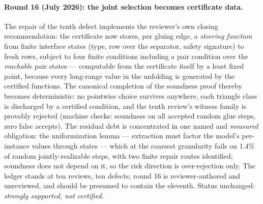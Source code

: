 \documentclass[
]{ceurart}
\theoremstyle{definition}
\begin{document}
\paragraph{Round 16 (July 2026): the joint selection becomes certificate
data.}
The repair of the tenth defect implements the reviewer's own closing
recommendation: the certificate now stores, per gluing edge, a
\emph{steering function} from finite interface states (type, row over
the separator, safety signature) to fresh rows, subject to four finite
conditions including a pair condition over the \emph{reachable} pair
states --- computable from the certificate itself by a least fixed
point, because every long-range value in the unfolding is generated by
the certified functions.  The canonical completion of the soundness
proof thereby becomes deterministic: no pointwise choice survives
anywhere, each triangle class is discharged by a certified condition,
and the tenth review's witness family is provably rejected (machine
checks: soundness on all accepted random glue steps, zero false
accepts).  The residual debt is concentrated in one named and
\emph{measured} obligation: the uniformization lemma --- extraction
must factor the model's per-instance values through states --- which at
the coarsest granularity fails on $1.4\%$ of random jointly-realizable
steps, with two finite repair routes identified; soundness does not
depend on it, so the risk direction is over-rejection only.  The ledger
stands at ten reviews, ten defects; round 16 is reviewer-authored and
unreviewed, and should be presumed to contain the eleventh.  Status
unchanged: \emph{strongly supported, not certified}.
\end{document}
